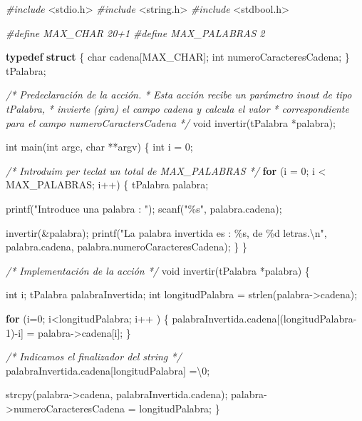\documentclass[
]{book}
\newenvironment{Shaded}{\begin{snugshade}}{\end{snugshade}}
\newcommand{\CharTok}[1]{\textcolor[rgb]{0.31,0.60,0.02}{#1}}
\newcommand{\CommentTok}[1]{\textcolor[rgb]{0.56,0.35,0.01}{\textit{#1}}}
\newcommand{\ControlFlowTok}[1]{\textcolor[rgb]{0.13,0.29,0.53}{\textbf{#1}}}
\newcommand{\DataTypeTok}[1]{\textcolor[rgb]{0.13,0.29,0.53}{#1}}
\newcommand{\DecValTok}[1]{\textcolor[rgb]{0.00,0.00,0.81}{#1}}
\newcommand{\ImportTok}[1]{#1}
\newcommand{\KeywordTok}[1]{\textcolor[rgb]{0.13,0.29,0.53}{\textbf{#1}}}
\newcommand{\NormalTok}[1]{#1}
\newcommand{\PreprocessorTok}[1]{\textcolor[rgb]{0.56,0.35,0.01}{\textit{#1}}}
\newcommand{\SpecialCharTok}[1]{\textcolor[rgb]{0.00,0.00,0.00}{#1}}
\newcommand{\StringTok}[1]{\textcolor[rgb]{0.31,0.60,0.02}{#1}}
\begin{document}
\begin{Shaded}
\begin{Highlighting}[]
\PreprocessorTok{\#include }\ImportTok{\textless{}stdio.h\textgreater{}}
\PreprocessorTok{\#include }\ImportTok{\textless{}string.h\textgreater{}}
\PreprocessorTok{\#include }\ImportTok{\textless{}stdbool.h\textgreater{}}

\PreprocessorTok{\#define MAX\_CHAR 20+1}
\PreprocessorTok{\#define MAX\_PALABRAS 2}

\KeywordTok{typedef} \KeywordTok{struct}\NormalTok{ \{}
    \DataTypeTok{char}\NormalTok{ cadena[MAX\_CHAR];}
    \DataTypeTok{int}\NormalTok{ numeroCaracteresCadena;}
\NormalTok{\} tPalabra;}

\CommentTok{/* Predeclaración de la acción.}
\CommentTok{ * Esta acción recibe un parámetro inout de tipo tPalabra,}
\CommentTok{ * invierte (gira) el campo cadena y calcula el valor}
\CommentTok{ * correspondiente para el campo numeroCaractersCadena}
\CommentTok{ */}
\DataTypeTok{void}\NormalTok{ invertir(tPalabra *palabra);}

\DataTypeTok{int}\NormalTok{ main(}\DataTypeTok{int}\NormalTok{ argc, }\DataTypeTok{char}\NormalTok{ **argv) \{}
    \DataTypeTok{int}\NormalTok{ i = }\DecValTok{0}\NormalTok{;}
    
    \CommentTok{/* Introduim per teclat un total de MAX\_PALABRAS */}
    \ControlFlowTok{for}\NormalTok{ (i = }\DecValTok{0}\NormalTok{; i \textless{} MAX\_PALABRAS; i++) \{}
\NormalTok{        tPalabra palabra;}
    
\NormalTok{        printf(}\StringTok{"Introduce una palabra : "}\NormalTok{);}
\NormalTok{        scanf(}\StringTok{"\%s"}\NormalTok{, palabra.cadena);}
    
\NormalTok{        invertir(\&palabra);}
\NormalTok{        printf(}\StringTok{"La palabra invertida es : \%s, de \%d letras.}\SpecialCharTok{\textbackslash{}n}\StringTok{"}\NormalTok{, palabra.cadena, palabra.numeroCaracteresCadena);}
\NormalTok{    \}}
\NormalTok{\}}

\CommentTok{/* Implementación de la acción */}
\DataTypeTok{void}\NormalTok{ invertir(tPalabra *palabra) \{}
    
    \DataTypeTok{int}\NormalTok{ i;}
\NormalTok{    tPalabra palabraInvertida;}
    \DataTypeTok{int}\NormalTok{ longitudPalabra = strlen(palabra{-}\textgreater{}cadena);}
 
    \ControlFlowTok{for}\NormalTok{ (i=}\DecValTok{0}\NormalTok{; i\textless{}longitudPalabra; i++ ) \{}
\NormalTok{        palabraInvertida.cadena[(longitudPalabra{-}}\DecValTok{1}\NormalTok{){-}i] = palabra{-}\textgreater{}cadena[i];}
\NormalTok{    \}}
    
    \CommentTok{/* Indicamos el finalizador del string */}
\NormalTok{    palabraInvertida.cadena[longitudPalabra] =}\CharTok{\textquotesingle{}\textbackslash{}0\textquotesingle{}}\NormalTok{;}
    
\NormalTok{    strcpy(palabra{-}\textgreater{}cadena, palabraInvertida.cadena);}
\NormalTok{    palabra{-}\textgreater{}numeroCaracteresCadena = longitudPalabra;}
\NormalTok{\}}
\end{Highlighting}
\end{Shaded}
\end{document}
